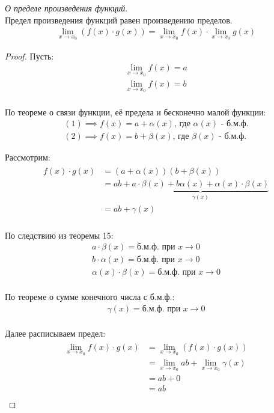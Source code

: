 \begin{theorem}
  \textit{О пределе произведения функций}. \\
  Предел произведения функций равен произведению пределов.
  \begin{gather*}
    \lim_{x \to x_0} (f(x) \cdot g(x)) = \lim_{x \to x_0} f(x) \cdot \lim_{x \to x_0} g(x)
  \end{gather*}
\end{theorem}
\begin{proof}
  Пусть:
  \begin{gather*}
    \lim_{x \to x_0} f(x) = a \tag{1} \\
    \lim_{x \to x_0} f(x) = b \tag{2} \\
  \end{gather*}

  По теореме о связи функции, её предела и бесконечно малой функции:
  \begin{gather*}
    (1) \implies f(x) = a + \alpha(x) \text{, где } \alpha(x) \text{ - б.м.ф.} \\
    (2) \implies f(x) = b + \beta(x) \text{, где } \beta(x) \text{ - б.м.ф.}
  \end{gather*}

  Рассмотрим:
  \begin{gather*}
    \begin{align*}
      f(x) \cdot g(x) &= (a + \alpha(x))(b + \beta(x)) \\
                      &= ab + \underbrace{a \cdot \beta(x) + b \alpha (x) + \alpha(x) \cdot \beta(x)}_{\gamma(x)} \\
                  &= ab + \gamma(x) \\
    \end{align*}
  \end{gather*}

  По следствию из теоремы 15:
  \begin{gather*}
    a \cdot \beta(x) = \text{б.м.ф. при } x \to 0 \\ 
    b \cdot \alpha(x) = \text{б.м.ф. при } x \to 0 \\ 
    \alpha(x) \cdot \beta(x) = \text{б.м.ф. при } x \to 0 \\ 
  \end{gather*}

  По теореме о сумме конечного числа с б.м.ф.:
  \begin{gather*}
    \gamma(x) = \text{б.м.ф. при } x \to 0 \\ 
  \end{gather*}

  Далее расписываем предел:
  \begin{gather*}
    \begin{align*}
      \lim_{x \to x_0} f(x) \cdot g(x) &= \lim_{x \to x_0} (f(x) \cdot g(x)) \\
                                &= \lim_{x \to x_0} ab + \lim_{x \to x_0} \gamma(x) \\
                                &= ab + 0 \\
                                &= ab \\
    \end{align*}
  \end{gather*}
\end{proof}
